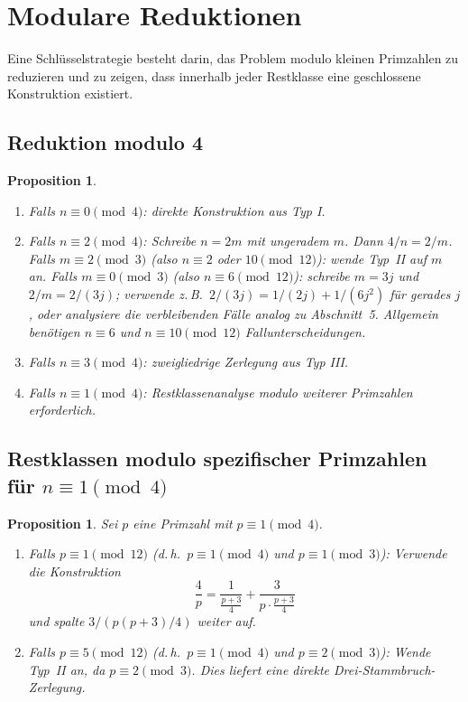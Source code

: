 \documentclass[12pt,a4paper]{amsart}
\newtheorem{proposition}[theorem]{Proposition}
\theoremstyle{definition}
\begin{document}
\section{Modulare Reduktionen}

Eine Schlüsselstrategie besteht darin, das Problem modulo kleinen Primzahlen
zu reduzieren und zu zeigen, dass innerhalb jeder Restklasse eine
geschlossene Konstruktion existiert.

\subsection{Reduktion modulo 4}

\begin{proposition}\label{prop:mod4}
\begin{enumerate}[label=(\roman*)]
\item Falls $n \equiv 0 \pmod 4$: direkte Konstruktion aus Typ I.
\item Falls $n \equiv 2 \pmod 4$: Schreibe $n = 2m$ mit ungeradem $m$.
      Dann $4/n = 2/m$.  Falls $m \equiv 2 \pmod 3$ (also $n \equiv 2$
      oder $10 \pmod{12}$): wende Typ~II auf $m$ an.  Falls $m \equiv 0
      \pmod 3$ (also $n \equiv 6 \pmod{12}$): schreibe $m = 3j$ und
      $2/m = 2/(3j)$; verwende z.\,B.\ $2/(3j) = 1/(2j) + 1/(6j^2)$
      für gerades $j$, oder analysiere die verbleibenden Fälle analog
      zu Abschnitt~5. Allgemein benötigen $n \equiv 6$ und
      $n \equiv 10 \pmod{12}$ Fallunterscheidungen.
\item Falls $n \equiv 3 \pmod 4$: zweigliedrige Zerlegung aus Typ III.
\item Falls $n \equiv 1 \pmod 4$: Restklassenanalyse modulo weiterer Primzahlen erforderlich.
\end{enumerate}
\end{proposition}

\subsection{Restklassen modulo spezifischer Primzahlen für $n \equiv 1 \pmod 4$}

\begin{proposition}\label{prop:mod-faelle}
Sei $p$ eine Primzahl mit $p \equiv 1 \pmod 4$.
\begin{enumerate}[label=(\roman*)]
\item Falls $p \equiv 1 \pmod{12}$ (d.\,h.\ $p \equiv 1 \pmod 4$
      und $p \equiv 1 \pmod 3$): Verwende die Konstruktion
      \[
        \frac{4}{p} = \frac{1}{\frac{p+3}{4}} + \frac{3}{p \cdot \frac{p+3}{4}}
      \]
      und spalte $3/(p(p+3)/4)$ weiter auf.

\item Falls $p \equiv 5 \pmod{12}$ (d.\,h.\ $p \equiv 1 \pmod 4$
      und $p \equiv 2 \pmod 3$): Wende Typ~II an, da $p \equiv 2 \pmod 3$.
      Dies liefert eine direkte Drei-Stammbruch-Zerlegung.
\end{enumerate}
\end{proposition}
\end{document}
